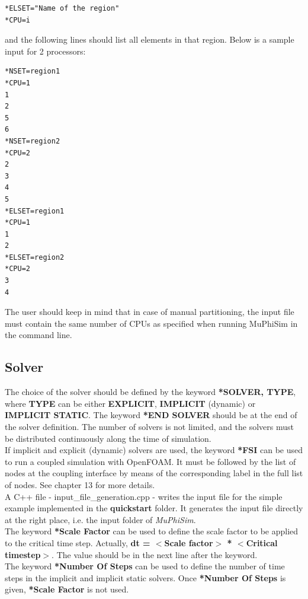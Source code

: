 \documentclass[oneside,11pt,times]{book}
\begin{document}
\begin{lstlisting}
*ELSET="Name of the region"
*CPU=i
\end{lstlisting}

and the following lines should list all elements in that region. Below is a sample input for 2 processors:

\begin{lstlisting}
*NSET=region1
*CPU=1
1
2
5
6
*NSET=region2
*CPU=2
2
3
4
5
*ELSET=region1
*CPU=1
1
2
*ELSET=region2
*CPU=2
3
4
\end{lstlisting}

The user should keep in mind that in case of manual partitioning, the input file must contain the same number of CPUs as specified when running MuPhiSim in the command line.


\subsection{Solver}
The choice of the solver should be defined by the keyword \textbf{*SOLVER, TYPE}, where  \textbf{TYPE} can be either \textbf{EXPLICIT}, \textbf{IMPLICIT} (dynamic) or \textbf{IMPLICIT STATIC}. The keyword \textbf{*END SOLVER} should be at the end of the solver definition. The number of solvers is not limited, and the solvers must be distributed continuously along the time of simulation. \\

If implicit and explicit (dynamic) solvers are used, the keyword \textbf{*FSI} can be used to run a coupled simulation with OpenFOAM. It must be followed by the list of nodes at the coupling interface by means of the corresponding label in the full list of nodes. See chapter 13 for more details.\\

A C++ file - input\_file\_generation.cpp - writes the input file for the simple example implemented in the \textbf{quickstart} folder. It generates the input file directly at the right place, i.e. the
input folder of \textit{MuPhiSim}.\\

The keyword \textbf{*Scale Factor} can be used to define the scale factor to be applied to the critical time step. Actually, \textbf{dt = $<$Scale factor$>$ * $<$Critical timestep$>$}. The value should be in the next line after the keyword.\\

The keyword \textbf{*Number Of Steps} can be used to define the number of time steps in the implicit and implicit static solvers. Once \textbf{*Number Of Steps} is given, \textbf{*Scale Factor} is not used.\\
\end{document}
